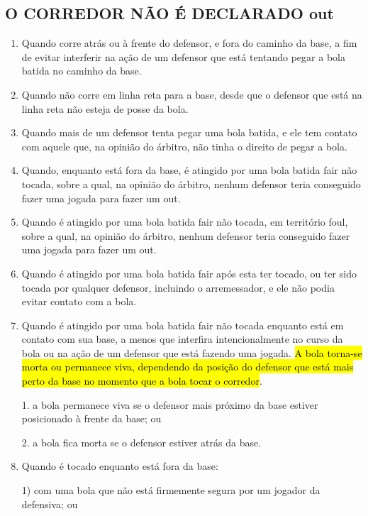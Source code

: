 \subsection{O CORREDOR NÃO É DECLARADO \gls{out}}
\begin{enumerate}[label=(\alph*)]
	\item   Quando corre atrás ou à frente do defensor, e fora do caminho da base, a fim de evitar interferir na ação de um defensor que está tentando pegar a bola batida no caminho da base.
	\item  Quando não corre em linha reta para a base, desde que o defensor que está na linha reta não esteja de posse da bola.
	\item  Quando mais de um defensor tenta pegar uma bola batida, e ele tem contato com aquele que, na opinião do árbitro, não tinha o direito de pegar a bola.
	\item  Quando, enquanto está fora da base, é atingido por uma bola batida \gls{fair} não tocada, sobre a qual, na opinião do árbitro, nenhum defensor teria conseguido fazer uma jogada para fazer um \gls{out}.
	\item  Quando é atingido por uma bola batida \gls{fair} não tocada, em território \gls{foul}, sobre a qual, na opinião do árbitro, nenhum defensor teria conseguido fazer uma jogada para fazer um \gls{out}.
	\item  Quando é atingido por uma bola batida \gls{fair} após esta ter tocado, ou ter sido tocada por qualquer defensor, incluindo o arremessador, e ele não podia evitar contato com a bola.
	\item   Quando é atingido por uma bola batida \gls{fair} não tocada enquanto está em contato com sua base, a menos que interfira intencionalmente no curso da bola
	ou na ação de um defensor que está fazendo uma jogada. \hl{A bola torna-se morta ou permanece viva, dependendo da posi\c{c}\~ao do defensor que est\'a mais perto da base no momento que a bola tocar o corredor}.

	\begin{mdframed}[hidealllines=true,backgroundcolor=blue!20]
		1. a bola permanece viva se o defensor mais próximo da base estiver posicionado à frente da base; ou

		2. a bola fica morta se o defensor estiver atrás da base.
	\end{mdframed}
	\item   Quando é tocado enquanto está fora da base:

	1) com uma bola que não está firmemente segura por um jogador da defensiva; ou


\end{enumerate}
